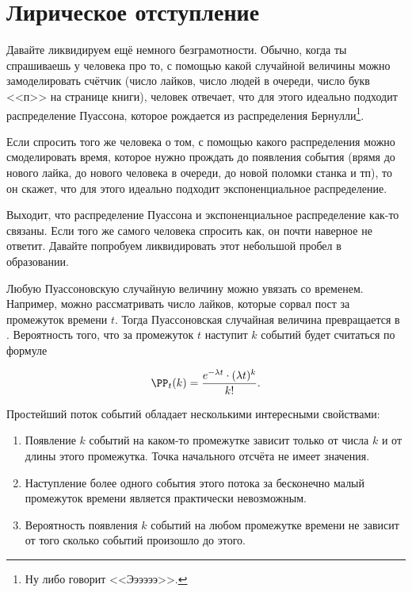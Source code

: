 \section{Лирическое отступление}

Давайте ликвидируем ещё немного безграмотности. Обычно, когда ты спрашиваешь у человека про то, с помощью какой случайной величины можно замоделировать счётчик (число лайков, число людей в очереди, число букв <<п>> на странице книги), человек отвечает, что для этого идеально подходит распределение Пуассона, которое рождается из распределения Бернулли\footnote{Ну либо говорит <<Ээээээ>>.}. 

Если спросить того же человека о том, с помощью какого распределения можно смоделировать время, которое нужно прождать до появления события (врямя до нового лайка, до нового человека в очереди, до новой поломки станка и тп), то он скажет, что для этого идеально подходит экспоненциальное распределение. 

Выходит, что распределение Пуассона и экспоненциальное распределение как-то связаны. Если того же самого человека спросить как, он почти наверное не ответит. Давайте попробуем ликвидировать этот небольшой пробел в образовании. 

Любую Пуассоновскую случайную величину можно увязать со временем. Например, можно рассматривать число лайков, которые сорвал пост за промежуток времени $t$. Тогда Пуассоновская случайная величина превращается в .  Вероятность того, что за промежуток $t$ наступит $k$ событий будет считаться по формуле 

\[ \PP_t(k) = \frac{e^{-\lambda t} \cdot (\lambda t)^k}{k!}. \]

Простейший поток событий обладает несколькими интересными свойствами: 

\begin{enumerate}
	\item {} Появление $k$ событий на каком-то промежутке зависит только от числа $k$ и от длины этого промежутка. Точка начального отсчёта не имеет значения. 
	\item {} Наступление более одного события этого потока за бесконечно малый промежуток времени является практически невозможным. 
	\item {}  Вероятность появления $k$ событий на любом промежутке времени не зависит от того сколько событий произошло до этого. 	
\end{enumerate}

